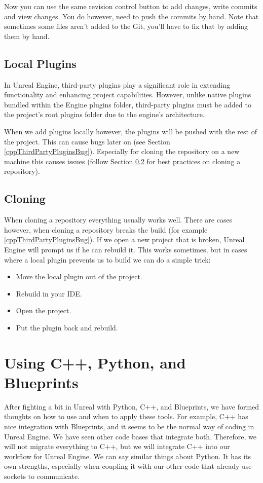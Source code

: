 \documentclass{uva-inf-article}
\begin{document}
Now you can use the same revision control button to add changes, write commits and view changes. You do however, need to push the commits by hand.
Note that sometimes some files aren't added to the Git, you'll have to fix that by adding them by hand.

\subsection{Local Plugins}
In Unreal Engine, third-party plugins play a significant role in extending functionality and enhancing project capabilities. However, unlike native plugins bundled within the Engine plugins folder, third-party plugins must be added to the project's root plugins folder due to the engine's architecture.

When we add plugins locally however, the plugins will be pushed with the rest of the project. This can cause bugs later on (see Section \ref{cppThirdPartyPluginsBug}). Especially for cloning the repository on a new machine this causes issues (follow Section \ref{cloning} for best practices on cloning a repository).

\subsection{Cloning}\label{cloning}
When cloning a repository everything usually works well. There are cases however, when cloning a repository breaks the build (for example \ref{cppThirdPartyPluginsBug}).
If we open a new project that is broken, Unreal Engine will prompt us if he can rebuild it. This works sometimes, but in cases where a local plugin prevents us to build we can do a simple trick:
\begin{itemize}
    \item Move the local plugin out of the project.
    \item Rebuild in your IDE.
    \item Open the project.
    \item Put the plugin back and rebuild.
\end{itemize}

\section{Using C++, Python, and Blueprints}
After fighting a bit in Unreal with Python, C++, and Blueprints, we have formed thoughts on how to use and when to apply these tools. For example, C++ has nice integration with Blueprints, and it seems to be the normal way of coding in Unreal Engine. We have seen other code bases that integrate both. Therefore, we will not migrate everything to C++, but we will integrate C++ into our workflow for Unreal Engine. We can say similar things about Python. It has its own strengths, especially when coupling it with our other code that already use sockets to communicate.
\end{document}
